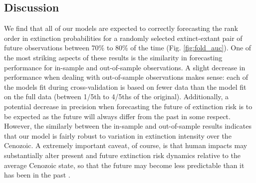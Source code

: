 \documentclass[12pt,letterpaper]{article}
\begin{document}
\begin{refsection}
%
%
%



\section{Discussion}

We find that all of our models are expected to correctly forecasting the rank order in extinction probabilities for a randomly selected extinct-extant pair of future observations between 70\% to 80\% of the time (Fig. \ref{fig:fold_auc}). One of the most striking aspects of these results is the similarity in forecasting performance for in-sample and out-of-sample observations. A slight decrease in performance when dealing with out-of-sample observations makes sense: each of the models fit during cross-validation is based on fewer data than the model fit on the full data (between 1/5th to 4/5ths of the original). Additionally, a potential decrease in precision when forecasting the future of extinction risk is to be expected as the future will always differ from the past in some respect. However, the similarly between the in-sample and out-of-sample results indicates that our model is fairly robust to variation in extinction intensity over the Cenozoic. A extremely important caveat, of course, is that human impacts may substantially alter present and future extinction risk dynamics relative to the average Cenozoic state, so that the future may become less predictable than it has been in the past \citep{Harnik2012a,Finnegan2015}.


\end{refsection}
\end{document}
